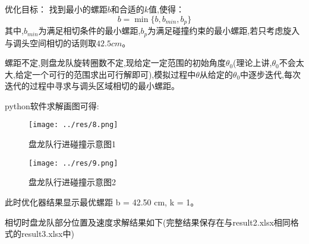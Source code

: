 \noindent 优化目标：
找到最小的螺距$b$和合适的$k$值,使得：
\begin{equation}
	b = \min\{b, b_{min}, b_p\}
\end{equation}
其中,$b_{min}$为满足相切条件的最小螺距,$b_p$为满足碰撞约束的最小螺距,若只考虑旋入与调头空间相切的话则取$42.5cm$。


螺距不定,则盘龙队旋转圈数不定,现给定一定范围的初始角度$\theta_{0}$(理论上讲,$\theta_{0}$不会太大,给定一个可行的范围求出可行解即可),模拟过程中$\theta$从给定的$\theta_{0}$中逐步迭代,每次迭代的过程中寻求与调头区域相切的最小螺距。

python软件求解画图可得:

\begin{figure}[htbp]
	\centering
	\texttt{[image: ../res/8.png]}
	\caption{盘龙队行进碰撞示意图1}
	\label{fig:盘龙队行进碰撞示意图1}
\end{figure}

\begin{figure}[htbp]
	\centering
	\texttt{[image: ../res/9.png]}
	\caption{盘龙队行进碰撞示意图2}
	\label{fig:盘龙队行进碰撞示意图2}
\end{figure}

此时优化器结果显示最优螺距 b = 42.50 cm, k = 1。

相切时盘龙队部分位置及速度求解结果如下(完整结果保存在与result2.xlsx相同格式的result3.xlsx中)

